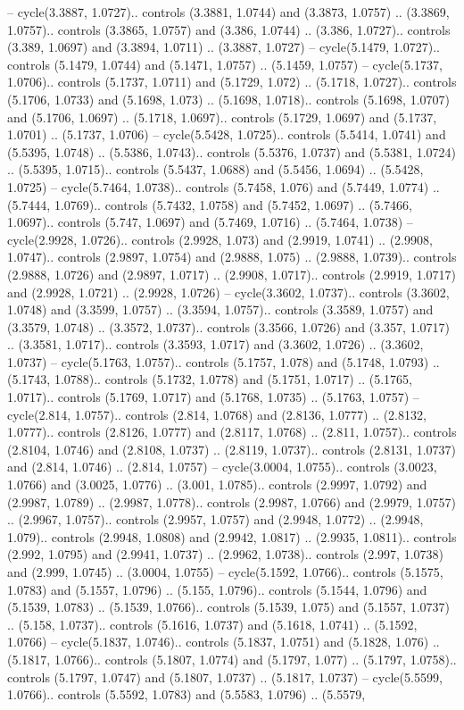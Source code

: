 -- cycle(3.3887, 1.0727).. controls (3.3881, 1.0744) and (3.3873, 1.0757) .. (3.3869, 1.0757).. controls (3.3865, 1.0757) and (3.386, 1.0744) .. (3.386, 1.0727).. controls (3.389, 1.0697) and (3.3894, 1.0711) .. (3.3887, 1.0727) -- cycle(5.1479, 1.0727).. controls (5.1479, 1.0744) and (5.1471, 1.0757) .. (5.1459, 1.0757) -- cycle(5.1737, 1.0706).. controls (5.1737, 1.0711) and (5.1729, 1.072) .. (5.1718, 1.0727).. controls (5.1706, 1.0733) and (5.1698, 1.073) .. (5.1698, 1.0718).. controls (5.1698, 1.0707) and (5.1706, 1.0697) .. (5.1718, 1.0697).. controls (5.1729, 1.0697) and (5.1737, 1.0701) .. (5.1737, 1.0706) -- cycle(5.5428, 1.0725).. controls (5.5414, 1.0741) and (5.5395, 1.0748) .. (5.5386, 1.0743).. controls (5.5376, 1.0737) and (5.5381, 1.0724) .. (5.5395, 1.0715).. controls (5.5437, 1.0688) and (5.5456, 1.0694) .. (5.5428, 1.0725) -- cycle(5.7464, 1.0738).. controls (5.7458, 1.076) and (5.7449, 1.0774) .. (5.7444, 1.0769).. controls (5.7432, 1.0758) and (5.7452, 1.0697) .. (5.7466, 1.0697).. controls (5.747, 1.0697) and (5.7469, 1.0716) .. (5.7464, 1.0738) -- cycle(2.9928, 1.0726).. controls (2.9928, 1.073) and (2.9919, 1.0741) .. (2.9908, 1.0747).. controls (2.9897, 1.0754) and (2.9888, 1.075) .. (2.9888, 1.0739).. controls (2.9888, 1.0726) and (2.9897, 1.0717) .. (2.9908, 1.0717).. controls (2.9919, 1.0717) and (2.9928, 1.0721) .. (2.9928, 1.0726) -- cycle(3.3602, 1.0737).. controls (3.3602, 1.0748) and (3.3599, 1.0757) .. (3.3594, 1.0757).. controls (3.3589, 1.0757) and (3.3579, 1.0748) .. (3.3572, 1.0737).. controls (3.3566, 1.0726) and (3.357, 1.0717) .. (3.3581, 1.0717).. controls (3.3593, 1.0717) and (3.3602, 1.0726) .. (3.3602, 1.0737) -- cycle(5.1763, 1.0757).. controls (5.1757, 1.078) and (5.1748, 1.0793) .. (5.1743, 1.0788).. controls (5.1732, 1.0778) and (5.1751, 1.0717) .. (5.1765, 1.0717).. controls (5.1769, 1.0717) and (5.1768, 1.0735) .. (5.1763, 1.0757) -- cycle(2.814, 1.0757).. controls (2.814, 1.0768) and (2.8136, 1.0777) .. (2.8132, 1.0777).. controls (2.8126, 1.0777) and (2.8117, 1.0768) .. (2.811, 1.0757).. controls (2.8104, 1.0746) and (2.8108, 1.0737) .. (2.8119, 1.0737).. controls (2.8131, 1.0737) and (2.814, 1.0746) .. (2.814, 1.0757) -- cycle(3.0004, 1.0755).. controls (3.0023, 1.0766) and (3.0025, 1.0776) .. (3.001, 1.0785).. controls (2.9997, 1.0792) and (2.9987, 1.0789) .. (2.9987, 1.0778).. controls (2.9987, 1.0766) and (2.9979, 1.0757) .. (2.9967, 1.0757).. controls (2.9957, 1.0757) and (2.9948, 1.0772) .. (2.9948, 1.079).. controls (2.9948, 1.0808) and (2.9942, 1.0817) .. (2.9935, 1.0811).. controls (2.992, 1.0795) and (2.9941, 1.0737) .. (2.9962, 1.0738).. controls (2.997, 1.0738) and (2.999, 1.0745) .. (3.0004, 1.0755) -- cycle(5.1592, 1.0766).. controls (5.1575, 1.0783) and (5.1557, 1.0796) .. (5.155, 1.0796).. controls (5.1544, 1.0796) and (5.1539, 1.0783) .. (5.1539, 1.0766).. controls (5.1539, 1.075) and (5.1557, 1.0737) .. (5.158, 1.0737).. controls (5.1616, 1.0737) and (5.1618, 1.0741) .. (5.1592, 1.0766) -- cycle(5.1837, 1.0746).. controls (5.1837, 1.0751) and (5.1828, 1.076) .. (5.1817, 1.0766).. controls (5.1807, 1.0774) and (5.1797, 1.077) .. (5.1797, 1.0758).. controls (5.1797, 1.0747) and (5.1807, 1.0737) .. (5.1817, 1.0737) -- cycle(5.5599, 1.0766).. controls (5.5592, 1.0783) and (5.5583, 1.0796) .. (5.5579, 